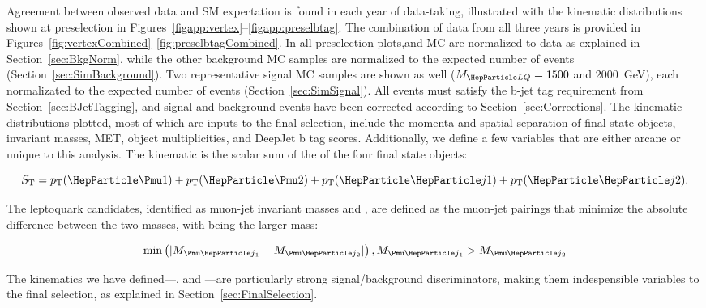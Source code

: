 Agreement between observed data and SM expectation is found in each year of data-taking, illustrated with the kinematic distributions shown at preselection in Figures~\ref{figapp:vertex}--\ref{figapp:preselbtag}. The combination of data from all three years is provided in Figures~\ref{fig:vertexCombined}--\ref{fig:preselbtagCombined}. In all preselection plots,\ZJETS and \ttbar MC are normalized to data as explained in Section~\ref{sec:BkgNorm}, while the other background MC samples are normalized to the expected number of events (Section~\ref{sec:SimBackground}). Two representative signal MC samples are shown as well ($\MLQ = 1500$ and \SI{2000}{\GeV}), each normalizated to the expected number of events (Section~\ref{sec:SimSignal}). All events must satisfy the b-jet tag requirement from Section~\ref{sec:BJetTagging}, and signal and background events have been corrected according to Section~\ref{sec:Corrections}. The kinematic distributions plotted, most of which are inputs to the final selection, include the momenta and spatial separation of final state objects, invariant masses, MET, object multiplicities, and DeepJet b tag scores. Additionally, we define a few variables that are either arcane or unique to this analysis. The kinematic \ST is the scalar sum of the \pt of the four final state objects:

\begin{equation}
       \ST = \pt(\PmuOne) + \pt(\PmuTwo) + \pt(\PjOne) + \pt(\PjTwo).
\end{equation}

The leptoquark candidates, identified as muon-jet invariant masses \MujOne and \MujTwo, are defined as the muon-jet pairings that minimize the absolute difference between the two masses, with \MujOne being the larger mass:

\begin{equation}
       \mathrm{min}\left( | \MujOne - \MujTwo | \right), \MujOne > \MujTwo
\end{equation}

The kinematics we have defined---\ST, \MujOne and \MujTwo---are particularly strong signal/background discriminators, making them indespensible variables to the final selection, as explained in Section~\ref{sec:FinalSelection}.

